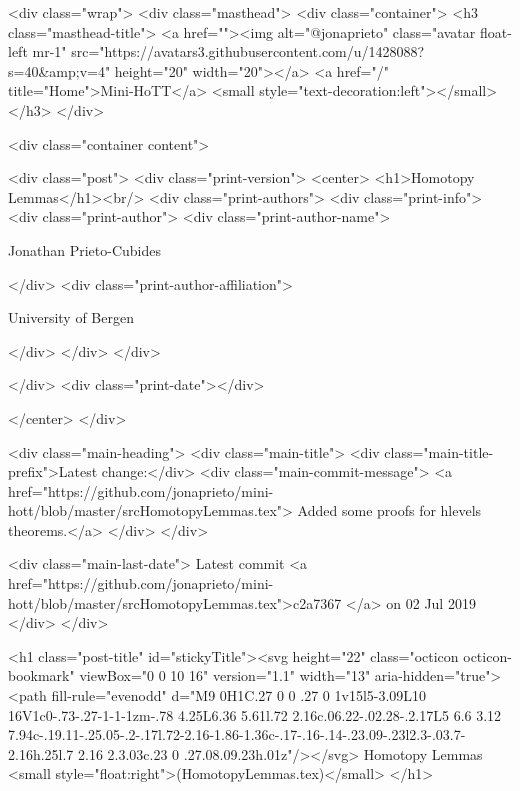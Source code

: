     <div class="wrap">
      <div class="masthead">
        <div class="container">
          <h3 class="masthead-title">
            <a href=""><img alt="@jonaprieto" class="avatar float-left mr-1" src="https://avatars3.githubusercontent.com/u/1428088?s=40&amp;v=4" height="20" width="20"></a>
            <a href="/" title="Home">Mini-HoTT</a>
            <small style="text-decoration:left"></small>
          </h3>
        </div>
      
      <div class="container content">
        







<div class="post">
  <div class="print-version">
    <center>
      <h1>Homotopy Lemmas</h1><br/>
        <div class="print-authors">
          <div class="print-info">
            <div class="print-author">
              <div class="print-author-name">
                
                  Jonathan Prieto-Cubides
                
              </div>
              <div class="print-author-affiliation">
                
                  University of Bergen
                
                </div>
            </div>
          </div>
          
          
        </div>
        <div class="print-date"></div>
        
        
    </center>
  </div>

  
  <div class="main-heading">
    <div class="main-title">
      <div class="main-title-prefix">Latest change:</div>
      <div class="main-commit-message">
            <a href="https://github.com/jonaprieto/mini-hott/blob/master/srcHomotopyLemmas.tex">
              Added some proofs for hlevels theorems.</a>
      </div>
    </div>

    <div class="main-last-date">
      Latest commit <a href="https://github.com/jonaprieto/mini-hott/blob/master/srcHomotopyLemmas.tex">c2a7367 </a> on  02 Jul 2019
    </div>
  </div>
  

  <h1 class="post-title" id="stickyTitle"><svg height="22" class="octicon octicon-bookmark" viewBox="0 0 10 16" version="1.1" width="13" aria-hidden="true"><path fill-rule="evenodd" d="M9 0H1C.27 0 0 .27 0 1v15l5-3.09L10 16V1c0-.73-.27-1-1-1zm-.78 4.25L6.36 5.61l.72 2.16c.06.22-.02.28-.2.17L5 6.6 3.12 7.94c-.19.11-.25.05-.2-.17l.72-2.16-1.86-1.36c-.17-.16-.14-.23.09-.23l2.3-.03.7-2.16h.25l.7 2.16 2.3.03c.23 0 .27.08.09.23h.01z"/></svg> Homotopy Lemmas <small style="float:right">(HomotopyLemmas.tex)</small>
  </h1>

